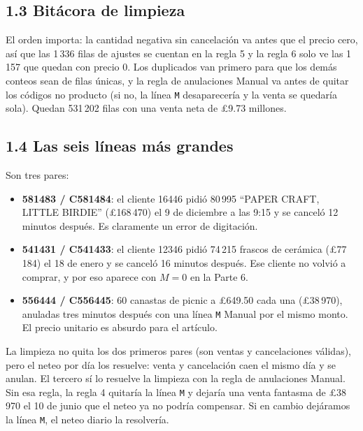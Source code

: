 \documentclass[11pt]{article}
\newcommand{\tabla}[1]{}
\begin{document}
\subsection*{1.3 Bitácora de limpieza}
\begin{table}[H]\centering\small
\caption{Bitácora en el orden en que se aplican las reglas. ``monto'' es la suma con signo y ``monto\_abs'' la suma de valores absolutos de lo eliminado.}
\tabla{p1_bitacora}
\end{table}
El orden importa: la cantidad negativa sin cancelación va antes que el precio cero, así que las 1\,336 filas de ajustes se cuentan en la regla 5 y la regla 6 solo ve las 1\,157 que quedan con precio 0. Los duplicados van primero para que los demás conteos sean de filas únicas, y la regla de anulaciones Manual va antes de quitar los códigos no producto (si no, la línea \texttt{M} desaparecería y la venta se quedaría sola). Quedan 531\,202 filas con una venta neta de £9.73 millones.

\subsection*{1.4 Las seis líneas más grandes}
\begin{table}[H]\centering\scriptsize
\caption{Las seis líneas con mayor $|Q\times P|$ antes de limpiar.}
\resizebox{\textwidth}{!}{\tabla{p1_top6}}
\end{table}
Son tres pares:
\begin{itemize}
\item \textbf{581483 / C581484}: el cliente 16446 pidió 80\,995 ``PAPER CRAFT, LITTLE BIRDIE'' (£168\,470) el 9 de diciembre a las 9:15 y se canceló 12 minutos después. Es claramente un error de digitación.
\item \textbf{541431 / C541433}: el cliente 12346 pidió 74\,215 frascos de cerámica (£77\,184) el 18 de enero y se canceló 16 minutos después. Ese cliente no volvió a comprar, y por eso aparece con $M=0$ en la Parte 6.
\item \textbf{556444 / C556445}: 60 canastas de picnic a £649.50 cada una (£38\,970), anuladas tres minutos después con una línea \texttt{M} Manual por el mismo monto. El precio unitario es absurdo para el artículo.
\end{itemize}
La limpieza no quita los dos primeros pares (son ventas y cancelaciones válidas), pero el neteo por día los resuelve: venta y cancelación caen el mismo día y se anulan. El tercero sí lo resuelve la limpieza con la regla de anulaciones Manual. Sin esa regla, la regla 4 quitaría la línea \texttt{M} y dejaría una venta fantasma de £38\,970 el 10 de junio que el neteo ya no podría compensar. Si en cambio dejáramos la línea \texttt{M}, el neteo diario la resolvería.
\end{document}
